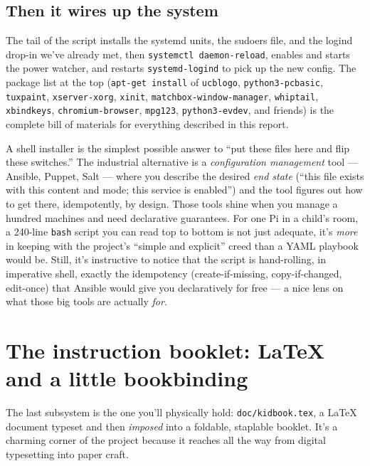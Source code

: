 \documentclass[11pt,oneside]{article}
\newcommand{\code}[1]{\texorpdfstring{\textcolor{kbblue}{\texttt{#1}}}{#1}}
\newcommand{\file}[1]{\textcolor{kbteal}{\texttt{#1}}}
\begin{document}
\subsection{Then it wires up the system}

The tail of the script installs the systemd units, the sudoers file, and the
logind drop-in we've already met, then \code{systemctl daemon-reload}, enables
and starts the power watcher, and restarts \texttt{systemd-logind} to pick up the
new config. The package list at the top (\code{apt-get install} of \texttt{ucblogo},
\texttt{python3-pcbasic}, \texttt{tuxpaint}, \texttt{xserver-xorg}, \texttt{xinit},
\texttt{matchbox-window-manager}, \texttt{whiptail}, \texttt{xbindkeys},
\texttt{chromium-browser}, \texttt{mpg123}, \texttt{python3-evdev}, and friends) is
the complete bill of materials for everything described in this report.

\begin{deeper}
A shell installer is the simplest possible answer to ``put these files here and
flip these switches.'' The industrial alternative is a \emph{configuration
management} tool --- Ansible, Puppet, Salt --- where you describe the desired
\emph{end state} (``this file exists with this content and mode; this service is
enabled'') and the tool figures out how to get there, idempotently, by design.
Those tools shine when you manage a hundred machines and need declarative
guarantees. For one Pi in a child's room, a 240-line \texttt{bash} script you can
read top to bottom is not just adequate, it's \emph{more} in keeping with the
project's ``simple and explicit'' creed than a YAML playbook would be. Still,
it's instructive to notice that the script is hand-rolling, in imperative shell,
exactly the idempotency (create-if-missing, copy-if-changed, edit-once) that
Ansible would give you declaratively for free --- a nice lens on what those big
tools are actually \emph{for}.
\end{deeper}

\section{The instruction booklet: LaTeX and a little bookbinding}

The last subsystem is the one you'll physically hold: \file{doc/kidbook.tex}, a
LaTeX document typeset and then \emph{imposed} into a foldable, staplable
booklet. It's a charming corner of the project because it reaches all the way
from digital typesetting into paper craft.
\end{document}
